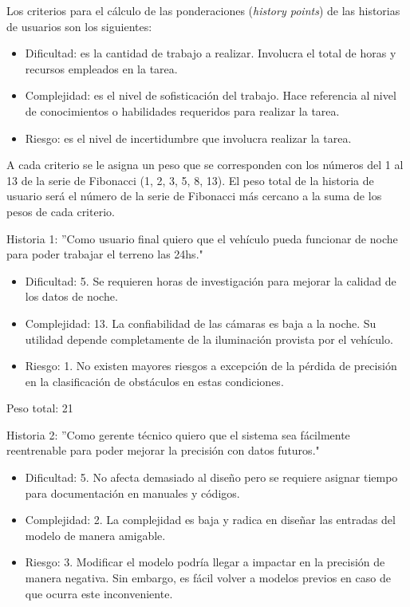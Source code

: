 \documentclass[
11pt, %
codirector, %
]{charter}
\begin{document}
Los criterios para el cálculo de las ponderaciones (\textit{history points}) de las historias de usuarios son los siguientes:

\begin{itemize}
	\item Dificultad: es la cantidad de trabajo a realizar. Involucra el total de horas y recursos empleados en la tarea.
	\item Complejidad: es el nivel de sofisticación del trabajo. Hace referencia al nivel de conocimientos o habilidades requeridos para realizar la tarea.
	\item Riesgo: es el nivel de incertidumbre que involucra realizar la tarea.
\end{itemize}

A cada criterio se le asigna un peso que se corresponden con los números del 1 al 13 de la serie de Fibonacci (1, 2, 3, 5, 8, 13). El peso total de la historia de usuario será el número de la serie de Fibonacci más cercano a la suma de los pesos de cada criterio.

Historia 1: ''Como usuario final quiero que el vehículo pueda funcionar de noche para poder trabajar el terreno las 24hs."

\begin{itemize}
	\item Dificultad: 5. Se requieren horas de investigación para mejorar la calidad de los datos de noche.
	\item Complejidad: 13. La confiabilidad de las cámaras es baja a la noche. Su utilidad depende completamente de la iluminación provista por el vehículo.
	\item Riesgo: 1. No existen mayores riesgos a excepción de la pérdida de precisión en la clasificación de obstáculos en estas condiciones.
\end{itemize}

Peso total: 21

Historia 2: ''Como gerente técnico quiero que el sistema sea fácilmente reentrenable para poder mejorar la precisión con datos futuros."

\begin{itemize}
	\item Dificultad: 5. No afecta demasiado al diseño pero se requiere asignar tiempo para documentación en manuales y códigos.
	\item Complejidad: 2. La complejidad es baja y radica en diseñar las entradas del modelo de manera amigable.
	\item Riesgo: 3. Modificar el modelo podría llegar a impactar en la precisión de manera negativa. Sin embargo, es fácil volver a modelos previos en caso de que ocurra este inconveniente.
\end{itemize}
	
\end{document}

